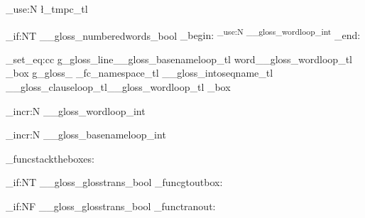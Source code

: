 {{{{					\tl_use:N
							\l_tmpc_tl
							
					\bool_if:NT
						\g__gloss_numberedwords_bool
						{
							\group_begin:
							\upshape
							\normalcolor
							\textsuperscript {	\int_use:N \g__gloss_wordloop_int }
							\group_end:
							}
	
			}

	\box_set_eq:cc 
{ g_gloss_line\g__gloss_basenameloop_tl word\g__gloss_wordloop_tl _box }
			{ g_gloss_ \g_fc_namespace_tl \g__gloss_intoseqname_tl \g__gloss_clauseloop_tl\g__gloss_wordloop_tl _box }



		
		\int_incr:N
					\g__gloss_wordloop_int
					
		} %


		\int_incr:N
					\g__gloss_basenameloop_int
					
		} %


\gl_funcstacktheboxes:


	\bool_if:NT
		\g__gloss_glosstrans_bool
		{ 
				\gl_funcgtoutbox:
			}				




	\bool_if:NF
		\g__gloss_glosstrans_bool
		{ 
				\gl_functranout:
			}				
}




